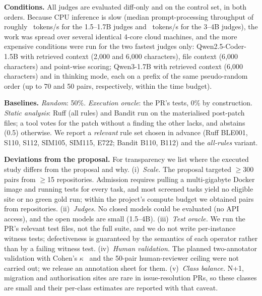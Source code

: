 \textbf{Conditions.}  All judges are evaluated diff-only and on the control set,
in both orders.  Because CPU inference is slow (median prompt-processing
throughput of roughly \SpeedSmall{}~tokens/s for the 1.5--1.7B judges and
\SpeedLarge{}~tokens/s for the 3--4B judges), the work was spread over several
identical 4-core cloud machines, and the more expensive conditions were run for
the two fastest judges only: Qwen2.5-Coder-1.5B with retrieved context (2{,}000
and 6{,}000 characters), file context (6{,}000 characters) and point-wise
scoring; Qwen3-1.7B with retrieved context (6{,}000 characters) and in thinking
mode, each on a prefix of the same pseudo-random order (up to 70 and 50 pairs,
respectively, within the time budget).

\textbf{Baselines.}  \emph{Random}: 50\%.  \emph{Execution oracle}: the PR's
tests, 0\% by construction.  \emph{Static analysis}: Ruff (all rules) and
Bandit run on the materialised post-patch files; a tool votes for the patch
without a finding the other lacks, and abstains (0.5) otherwise.  We report a
\emph{relevant} rule set chosen in advance (Ruff BLE001, S110, S112, SIM105,
SIM115, E722; Bandit B110, B112) and the \emph{all-rules} variant.

\textbf{Deviations from the proposal.}  For transparency we list where the
executed study differs from the proposal and why.
(i)~\emph{Scale.}  The proposal targeted $\geq$300 pairs from $\geq$15
repositories.  Admission requires pulling a multi-gigabyte Docker image and
running tests for every task, and most screened tasks yield no eligible site or
no green gold run; within the project's compute budget we obtained \NPairs{}
pairs from \NRepos{} repositories.
(ii)~\emph{Judges.}  No closed models could be evaluated (no API access), and
the open models are small (1.5--4B).
(iii)~\emph{Test oracle.}  We run the PR's relevant test files, not the full
suite, and we do not write per-instance witness tests; defectiveness is
guaranteed by the semantics of each operator rather than by a failing witness
test.
(iv)~\emph{Human validation.}  The planned two-annotator validation with
Cohen's $\kappa$~\cite{cohen1960kappa} and the 50-pair human-reviewer ceiling
were not carried out; we release an annotation sheet for them.
(v)~\emph{Class balance.}  N+1, migration and authorisation sites are rare in
issue-resolution PRs, so these classes are small and their per-class estimates
are reported with that caveat.
